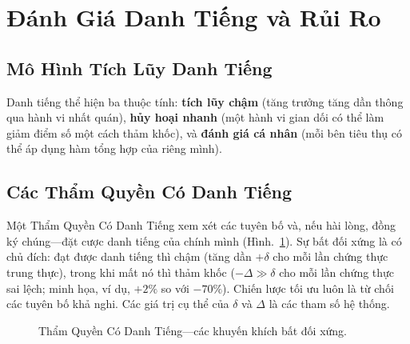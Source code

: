 \documentclass[11pt,a4paper,twocolumn]{article}
\begin{document}
\section{Đánh Giá Danh Tiếng và Rủi Ro}

\subsection{Mô Hình Tích Lũy Danh Tiếng}

Danh tiếng thể hiện ba thuộc tính: \textbf{tích lũy chậm} (tăng trưởng tăng dần thông qua hành vi nhất quán), \textbf{hủy hoại nhanh} (một hành vi gian dối có thể làm giảm điểm số một cách thảm khốc), và \textbf{đánh giá cá nhân} (mỗi bên tiêu thụ có thể áp dụng hàm tổng hợp của riêng mình).

\subsection{Các Thẩm Quyền Có Danh Tiếng}

Một Thẩm Quyền Có Danh Tiếng xem xét các tuyên bố và, nếu hài lòng, đồng ký chúng---đặt cược danh tiếng của chính mình (Hình.~\ref{fig:authority}). Sự bất đối xứng là có chủ đích: đạt được danh tiếng thì chậm (tăng dần $+\delta$ cho mỗi lần chứng thực trung thực), trong khi mất nó thì thảm khốc ($-\Delta \gg \delta$ cho mỗi lần chứng thực sai lệch; minh họa, ví dụ, $+2\%$ so với $-70\%$). Chiến lược tối ưu luôn là từ chối các tuyên bố khả nghi. Các giá trị cụ thể của $\delta$ và $\Delta$ là các tham số hệ thống.

\begin{figure}[ht]
\centering
{}
\caption{Thẩm Quyền Có Danh Tiếng---các khuyến khích bất đối xứng.}
\label{fig:authority}
\end{figure}
\end{document}
